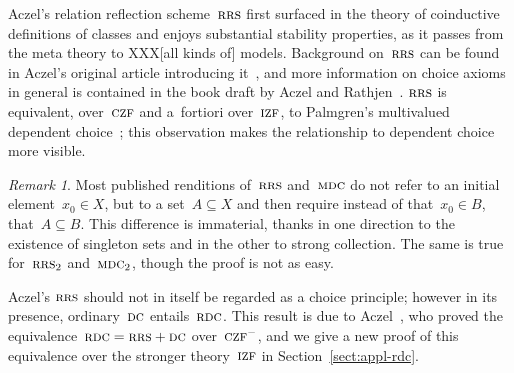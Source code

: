 \documentclass[oneside,reqno]{amsart}
\theoremstyle{definition}
\theoremstyle{plain}
\theoremstyle{remark}
\newtheorem{rem}[defn]{Remark}
\renewcommand{\_}{\mathpunct{.}\,}
\newcommand{\?}{\,{:}\,}
\newcommand{\IZF}{\textsc{izf}}
\newcommand{\CZF}{\textsc{czf}}
\newcommand{\RRS}{\textsc{rrs}}
\newcommand{\RDC}{\textsc{rdc}}
\newcommand{\DC}{\textsc{dc}}
\newcommand{\MDC}{\textsc{mdc}}
\begin{document}
Aczel's relation reflection scheme~$\RRS$ first surfaced in
the theory of coinductive definitions of classes and enjoys substantial
stability properties, as it passes from the meta theory to XXX[all kinds of]
models. Background on~$\RRS$ can be found in Aczel's original article
introducing it~\cite{aczel:rrs}, and more information on choice axioms in
general is contained in the book draft by Aczel and
Rathjen~\cite[Section~10]{aczel-rathjen:cst}.
$\RRS$ is equivalent, over~$\CZF$ and
a~fortiori over~$\IZF$, to Palmgren's multivalued dependent
choice~\cite{palmgren:mdc}; this observation makes the relationship to
dependent choice more visible.

\begin{rem}Most published renditions of~$\RRS$ and~$\MDC$ do not refer to an initial
element~$x_0 \in X$, but to a set~$A \subseteq X$ and then require instead
of that~$x_0 \in B$, that~$A \subseteq B$. This difference is immaterial, thanks in
one direction to the existence of singleton sets and in the other to strong
collection. The same is true for~$\RRS_2$ and~$\MDC_2$, though the proof is not
as easy.
\end{rem}


%
%
%
%
%

Aczel's $\RRS$ should not in itself be regarded as a choice principle; however in
its presence, ordinary~$\DC$ entails~$\RDC$. This result is due to
Aczel~\cite[Theorem~2.4]{aczel:rrs}, who proved the equivalence~$\RDC = \RRS +
\DC$ over~$\CZF^-$, and we give a new proof of this equivalence over the
stronger theory~$\IZF$ in Section~\ref{sect:appl-rdc}.
\end{document}
